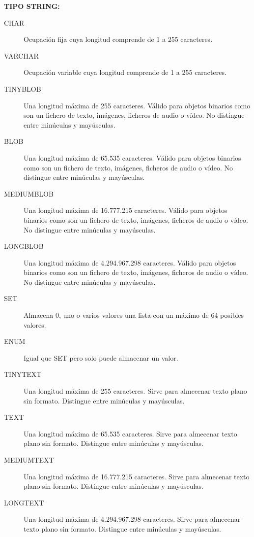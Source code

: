\documentclass[4paper]{article}
\begin{document}
\textbf{TIPO STRING:}
\begin{description}
\item[CHAR] Ocupación fija cuya longitud comprende de 1 a 255 caracteres.
\item[VARCHAR] Ocupación variable cuya longitud comprende de 1 a 255 caracteres.
\item[TINYBLOB] Una longitud máxima de 255 caracteres. Válido para objetos binarios como son un fichero de texto, imágenes, ficheros de audio o vídeo. No distingue entre minúculas y mayúsculas.
\item[BLOB] Una longitud máxima de 65.535 caracteres. Válido para objetos binarios como son un fichero de texto, imágenes, ficheros de audio o vídeo. No distingue entre minúculas y mayúsculas.
\item[MEDIUMBLOB] Una longitud máxima de 16.777.215 caracteres. Válido para objetos binarios como son un fichero de texto, imágenes, ficheros de audio o vídeo. No distingue entre minúculas y mayúsculas.
\item[LONGBLOB] Una longitud máxima de 4.294.967.298 caracteres. Válido para objetos binarios como son un fichero de texto, imágenes, ficheros de audio o vídeo. No distingue entre minúculas y mayúsculas.
\item[SET] Almacena 0, uno o varios valores una lista con un máximo de 64 posibles valores.
\item[ENUM] Igual que SET pero solo puede almacenar un valor.
\item[TINYTEXT] Una longitud máxima de 255 caracteres. Sirve para almecenar texto plano sin formato. Distingue entre minúculas y mayúsculas.
\item[TEXT] Una longitud máxima de 65.535 caracteres. Sirve para almecenar texto plano sin formato. Distingue entre minúculas y mayúsculas.
\item[MEDIUMTEXT] Una longitud máxima de 16.777.215 caracteres. Sirve para almecenar texto plano sin formato. Distingue entre minúculas y mayúsculas.
\item[LONGTEXT] Una longitud máxima de 4.294.967.298 caracteres. Sirve para almecenar texto plano sin formato. Distingue entre minúculas y mayúsculas.
\end{description}

\newpage
\end{document}

